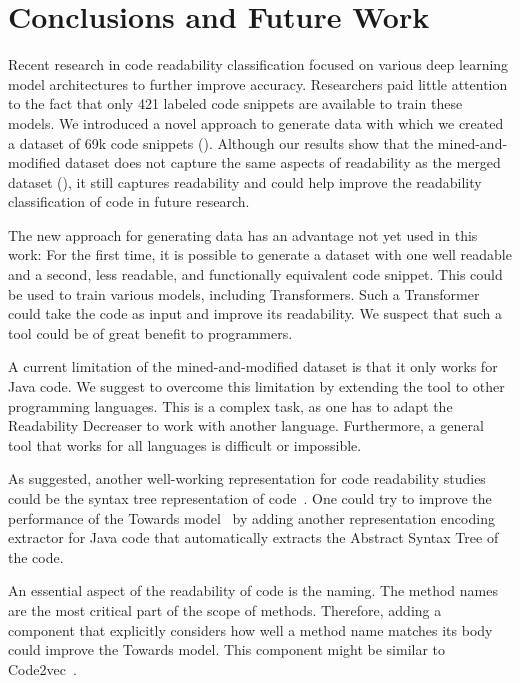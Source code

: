 \documentclass[%
class=scrreprt,
chapterprefix=false,%
open=right,%
twoside=true,%
paper=a4,%
logofile={Logo\_zentral\_farbig\_EN.png},%
thesistype=master,%
UKenglish,%
]{se2thesis}
\theoremstyle{definition}
\newcommand{\numSamples}{69k\xspace}
\newcommand{\RDH}{Readability Decreaser\xspace}
\begin{document}
\chapter{Conclusions and Future Work} \label{Conclusions}
	Recent research in code readability classification focused on various deep learning model architectures to further improve accuracy. Researchers paid little attention to the fact that only 421 labeled code snippets are available to train these models. We introduced a novel approach to generate data with which we created a dataset of \numSamples code snippets (). Although our results show that the mined-and-modified dataset does not capture the same aspects of readability as the merged dataset (), it still captures readability and could help improve the readability classification of code in future research.
	
	The new approach for generating data has an advantage not yet used in this work: For the first time, it is possible to generate a dataset with one well readable and a second, less readable, and functionally equivalent code snippet. This could be used to train various models, including Transformers. Such a Transformer could take the code as input and improve its readability. We suspect that such a tool could be of great benefit to programmers.  
	
	A current limitation of the mined-and-modified dataset is that it only works for Java code. We suggest to overcome this limitation by extending the tool to other programming languages. This is a complex task, as one has to adapt the \RDH to work with another language. Furthermore, a general tool that works for all languages is difficult or impossible.
	
	As \citeauthor{mi2023graph} suggested, another well-working representation for code readability studies could be the syntax tree representation of code~\cite{mi2023graph}. One could try to improve the performance of the Towards model~\cite{mi2022towards} by adding another representation encoding extractor for Java code that automatically extracts the Abstract Syntax Tree of the code.
	
    An essential aspect of the readability of code is the naming. The method names are the most critical part of the scope of methods. Therefore, adding a component that explicitly considers how well a method name matches its body could improve the Towards model. This component might be similar to Code2vec~\cite{alon2019code2vec}.
	
\end{document}
